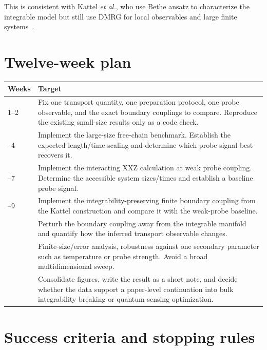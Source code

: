 \documentclass[11pt,a4paper]{article}
\begin{document}
This is consistent with Kattel \emph{et al.}, who use Bethe ansatz to characterize the integrable model but still use DMRG for local observables and large finite systems~\cite{kattel2025}.

\section{Twelve-week plan}

\begin{center}
\begin{tabularx}{0.97\textwidth}{@{}p{2.1cm}X@{}}
\toprule
\textbf{Weeks} & \textbf{Target} \\
\midrule
1--2
& Fix one transport quantity, one preparation protocol, one probe observable, and the exact boundary couplings to compare.  Reproduce the existing small-size results only as a code check. \\
\addlinespace
3--4
& Implement the large-size free-chain benchmark.  Establish the expected length/time scaling and determine which probe signal best recovers it. \\
\addlinespace
5--7
& Implement the interacting XXZ calculation at weak probe coupling.  Determine the accessible system sizes/times and establish a baseline probe signal. \\
\addlinespace
8--9
& Implement the integrability-preserving finite boundary coupling from the Kattel construction and compare it with the weak-probe baseline. \\
\addlinespace
10
& Perturb the boundary coupling away from the integrable manifold and quantify how the inferred transport observable changes. \\
\addlinespace
11
& Finite-size/error analysis, robustness against one secondary parameter such as temperature or probe strength.  Avoid a broad multidimensional sweep. \\
\addlinespace
12
& Consolidate figures, write the result as a short note, and decide whether the data support a paper-level continuation into bulk integrability breaking or quantum-sensing optimization. \\
\bottomrule
\end{tabularx}
\end{center}

\section{Success criteria and stopping rules}
\end{document}
